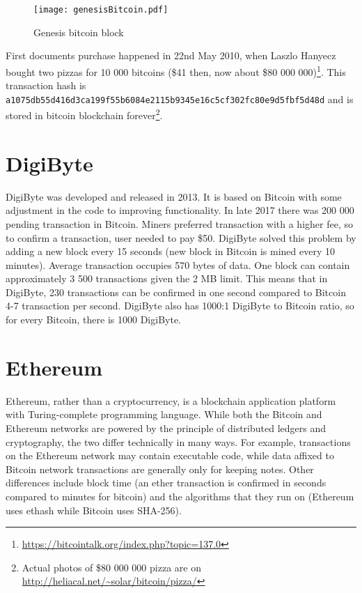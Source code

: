 \begin{figure}[h]
    \centering
    \texttt{[image: genesisBitcoin.pdf]}
    \caption{Genesis bitcoin block}
    \label{genesisBitcoin}
\end{figure}

First documents purchase happened in 22nd May 2010, when Laszlo Hanyecz bought two pizzas for 10 000 bitcoins (\$41 then, now about \$80 000 000)\footnote{\url{https://bitcointalk.org/index.php?topic=137.0}}. This transaction hash is \texttt{a1075db55d416d3ca199f55b6084e\-2115b9345e16c5cf302fc80e9d5fbf5d48d} and is stored in bitcoin blockchain forever\footnote{Actual photos of \$80 000 000 pizza are on \url{http://heliacal.net/~solar/bitcoin/pizza/}}.


\section{DigiByte}
DigiByte was developed and released in 2013. It is based on Bitcoin with some adjustment in the code to improving functionality. In late 2017 there was 200 000 pending transaction in Bitcoin. Miners preferred transaction with a higher fee, so to confirm a transaction, user needed to pay \$50. DigiByte solved this problem by adding a new block every 15 seconds (new block in Bitcoin is mined every 10 minutes). Average transaction occupies 570 bytes of data. One block can contain approximately 3 500 transactions given the 2 MB limit. This means that in DigiByte, 230 transactions can be confirmed in one second compared to Bitcoin 4-7 transaction per second. DigiByte also has 1000:1 DigiByte to Bitcoin ratio, so for every Bitcoin, there is 1000 DigiByte.\cite{digibyteBook}


\section{Ethereum}
Ethereum, rather than a cryptocurrency, is a blockchain application platform with Turing-complete programming language. While both the Bitcoin and Ethereum networks are powered by the principle of distributed ledgers and cryptography, the two differ technically in many ways. For example, transactions on the Ethereum network may contain executable code, while data affixed to Bitcoin network transactions are generally only for keeping notes. Other differences include block time (an ether transaction is confirmed in seconds compared to minutes for bitcoin) and the algorithms that they run on (Ethereum uses ethash while Bitcoin uses SHA-256).\cite{wood2014ethereum} \cite{buterin2014next}



